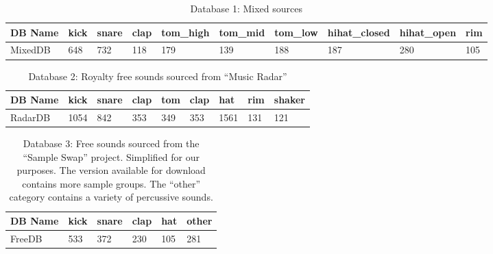 \documentclass[\main/thesis.tex]{subfiles}
\begin{document}


\begin{table}[p]
\centering
\hspace*{-2cm}\begin{tabular}[width=0.95\paperwidth]{|l|l|l|l|l|l|l|l|l|l|}
\hline
DB Name & kick & snare & clap & tom\_high & tom\_mid & tom\_low & hihat\_closed &  hihat\_open & rim \\ \hline
MixedDB & 648 & 732 & 118 & 179 & 139 &  188 & 187 & 280 & 105 \\\hline
\end{tabular}
\caption{Database 1: Mixed sources}
\label{db:self}
\end{table}

\begin{table}[h!]
\centering
\begin{tabular}{|l|l|l|l|l|l|l|l|l|}
\hline
DB Name & kick & snare & clap & tom & clap & hat & rim & shaker  \\ \hline
RadarDB & 1054 & 842   & 353 & 349 &  353 & 1561& 131 & 121 \\ \hline
\end{tabular}
\caption{Database 2: Royalty free sounds sourced from \enquote{Music Radar}}
\label{db:radar}
\end{table}

\begin{table}[h!]
\centering
\begin{tabular}{|l|l|l|l|l|l|}
\hline
 DB Name & kick & snare & clap & hat & other \\\hline
 FreeDB & 533 & 372 & 230 & 105 & 281 \\ \hline
\end{tabular}
\caption{Database 3: Free sounds sourced from the \enquote{Sample Swap} project. Simplified for our purposes. The version available for download contains more sample groups. The \enquote{other} category contains a variety of percussive sounds.}
\label{db:sampleswap}
\end{table}
\end{document}
